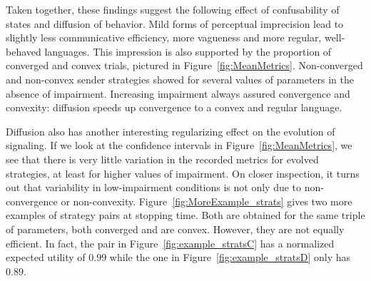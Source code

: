 \documentclass[fleqn,reqno,10pt]{article}
\begin{document}
Taken together, these findings suggest the following effect of
confusability of states and diffusion of behavior. Mild forms of
perceptual imprecision lead to slightly less communicative efficiency,
more vagueness and more regular, well-behaved languages. This
impression is also supported by the proportion of converged and convex
trials, pictured in
Figure~\ref{fig:MeanMetrics}. Non-converged and non-convex
sender strategies showed for several values of parameters in the
absence of impairment. Increasing impairment always assured
convergence and convexity: diffusion speeds up convergence to a convex
and regular language.

  


Diffusion also has another interesting regularizing effect on the
evolution of signaling. If we look at the confidence intervals in
Figure~\ref{fig:MeanMetrics}, we see that there is very little
variation in the recorded metrics for evolved strategies, at least for
higher values of impairment. On closer inspection, it turns out that
variability in low-impairment conditions is not only due to
non-convergence or non-convexity. Figure~\ref{fig:MoreExample_strats}
gives two more examples of strategy pairs at stopping time. Both are
obtained for the same triple of parameters, both converged and are
convex. However, they are not equally efficient. In fact, the pair in
Figure~\ref{fig:example_stratsC} has a normalized expected utility of
$0.99$ while the one in Figure~\ref{fig:example_stratsD} only has
$0.89$.
\end{document}
